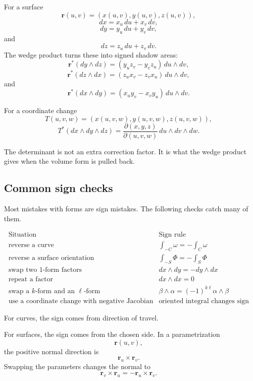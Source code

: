 For a surface
\[
    \mathbf r(u,v)=(x(u,v),y(u,v),z(u,v)),
\]
\[
\boxed{
    dx=x_u\,du+x_v\,dv,
}
\]
\[
\boxed{
    dy=y_u\,du+y_v\,dv,
}
\]
and
\[
\boxed{
    dz=z_u\,du+z_v\,dv.
}
\]
The wedge product turns these into signed shadow areas:
\[
\boxed{
    \mathbf r^*(dy\wedge dz)
    =
    (y_u z_v-y_v z_u)\,du\wedge dv,
}
\]
\[
\boxed{
    \mathbf r^*(dz\wedge dx)
    =
    (z_u x_v-z_v x_u)\,du\wedge dv,
}
\]
and
\[
\boxed{
    \mathbf r^*(dx\wedge dy)
    =
    (x_u y_v-x_v y_u)\,du\wedge dv.
}
\]

For a coordinate change
\[
    T(u,v,w)=(x(u,v,w),y(u,v,w),z(u,v,w)),
\]
\[
\boxed{
    T^*(dx\wedge dy\wedge dz)
    =
    \frac{\partial(x,y,z)}{\partial(u,v,w)}
    \,du\wedge dv\wedge dw.
}
\]

The determinant is not an extra correction factor.  It is what the wedge product gives
when the volume form is pulled back.

\subsection{Common sign checks}

Most mistakes with forms are sign mistakes.  The following checks catch many of them.

\[
\begin{array}{c|c}
\text{Situation} & \text{Sign rule} \\ \hline
\text{reverse a curve} &
\displaystyle \int_{-C}\omega=-\int_C\omega\\[3mm]
\text{reverse a surface orientation} &
\displaystyle \int_{-S}\Phi=-\int_S\Phi\\[3mm]
\text{swap two \(1\)-form factors} &
dx\wedge dy=-dy\wedge dx\\[2mm]
\text{repeat a factor} &
dx\wedge dx=0\\[2mm]
\text{swap a \(k\)-form and an \(\ell\)-form} &
\beta\wedge\alpha=(-1)^{k\ell}\alpha\wedge\beta\\[2mm]
\text{use a coordinate change with negative Jacobian} &
\text{oriented integral changes sign}
\end{array}
\]

For curves, the sign comes from direction of travel.

For surfaces, the sign comes from the chosen side.  In a parametrization
\[
    \mathbf r(u,v),
\]
the positive normal direction is
\[
    \mathbf r_u\times\mathbf r_v.
\]
Swapping the parameters changes the normal to
\[
    \mathbf r_v\times\mathbf r_u
    =
    -\mathbf r_u\times\mathbf r_v.
\]

